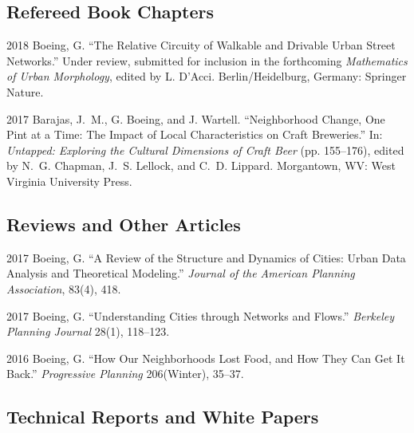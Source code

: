 \documentclass{academiccv}
\begin{document}
\subsection*{Refereed Book Chapters}

\begin{tablist}

\item[2018] \tab Boeing, G. \enquote{The Relative Circuity of Walkable and Drivable Urban Street Networks.} Under review, submitted for inclusion in the forthcoming \emph{Mathematics of Urban Morphology}, edited by L. D'Acci. Berlin/Heidelburg, Germany: Springer Nature.

\item[2017] \tab Barajas, J.~M., G. Boeing, and J. Wartell. \enquote{Neighborhood Change, One Pint at a Time: The Impact of Local Characteristics on Craft Breweries.} In: \emph{Untapped: Exploring the Cultural Dimensions of Craft Beer} (pp. 155--176), edited by N.~G. Chapman, J.~S. Lellock, and C.~D. Lippard. Morgantown, WV: West Virginia University Press.

\end{tablist}



\subsection*{Reviews and Other Articles}

\begin{tablist}
	
\item[2017] \tab Boeing, G. \enquote{A Review of the Structure and Dynamics of Cities: Urban Data Analysis and Theoretical Modeling.} \emph{Journal of the American Planning Association}, 83(4), 418.
	
\item[2017] \tab Boeing, G. \enquote{Understanding Cities through Networks and Flows.} \emph{Berkeley Planning Journal} 28(1), 118--123.

\item[2016] \tab Boeing, G. \enquote{How Our Neighborhoods Lost Food, and How They Can Get It Back.} \emph{Progressive Planning} 206(Winter), 35--37.
	
\end{tablist}



\subsection*{Technical Reports and White Papers}
\end{document}
